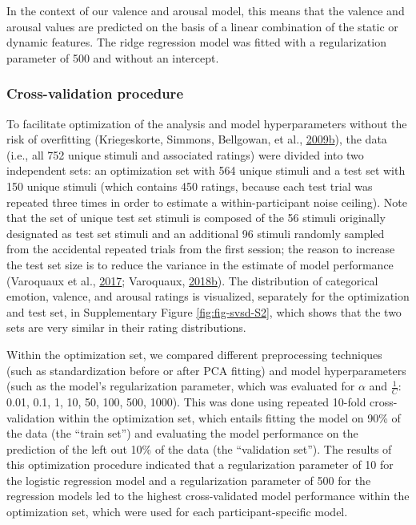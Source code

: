 \documentclass[11pt,american,]{memoir} %
\begin{document}
In the context of our valence and arousal model, this means that the valence and arousal values are predicted on the basis of a linear combination of the static or dynamic features. The ridge regression model was fitted with a regularization parameter of 500 and without an intercept.

\hypertarget{svsd-cv}{%
\subsubsection{Cross-validation procedure}\label{svsd-cv}}

To facilitate optimization of the analysis and model hyperparameters without the risk of overfitting (Kriegeskorte, Simmons, Bellgowan, et al., \protect\hyperlink{ref-Kriegeskorte2009-yz}{2009}\protect\hyperlink{ref-Kriegeskorte2009-yz}{b}), the data (i.e., all 752 unique stimuli and associated ratings) were divided into two independent sets: an optimization set with 564 unique stimuli and a test set with 150 unique stimuli (which contains 450 ratings, because each test trial was repeated three times in order to estimate a within-participant noise ceiling). Note that the set of unique test set stimuli is composed of the 56 stimuli originally designated as test set stimuli and an additional 96 stimuli randomly sampled from the accidental repeated trials from the first session; the reason to increase the test set size is to reduce the variance in the estimate of model performance (Varoquaux et al., \protect\hyperlink{ref-Varoquaux2017-fj}{2017}; Varoquaux, \protect\hyperlink{ref-Varoquaux2018-uo}{2018}\protect\hyperlink{ref-Varoquaux2018-uo}{b}). The distribution of categorical emotion, valence, and arousal ratings is visualized, separately for the optimization and test set, in Supplementary Figure \ref{fig:fig-svsd-S2}, which shows that the two sets are very similar in their rating distributions.

Within the optimization set, we compared different preprocessing techniques (such as standardization before or after PCA fitting) and model hyperparameters (such as the model's regularization parameter, which was evaluated for \(\alpha\) and \(\frac{1}{C}\): 0.01, 0.1, 1, 10, 50, 100, 500, 1000). This was done using repeated 10-fold cross-validation within the optimization set, which entails fitting the model on 90\% of the data (the ``train set'') and evaluating the model performance on the prediction of the left out 10\% of the data (the ``validation set''). The results of this optimization procedure indicated that a regularization parameter of 10 for the logistic regression model and a regularization parameter of 500 for the regression models led to the highest cross-validated model performance within the optimization set, which were used for each participant-specific model.
\end{document}
